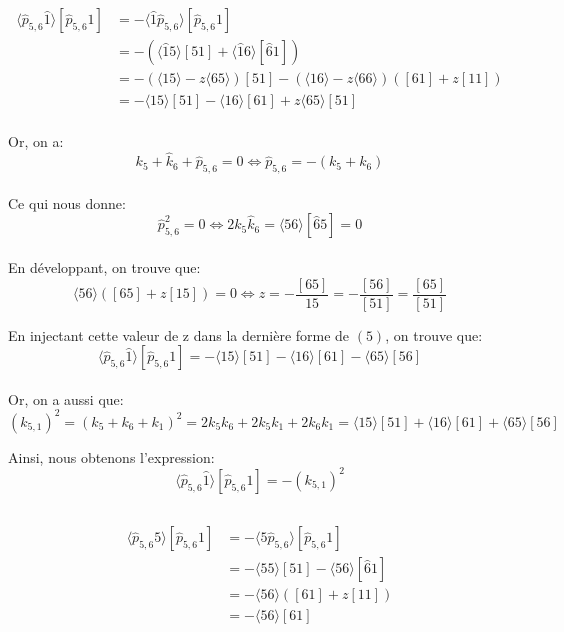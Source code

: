 \documentclass[12pt, a4paper]{article}
\begin{document}
		\subsection{}
		\begin{equation}
			\begin{split}
				\langle \hat{p}_{5,6}\hat{1} \rangle [\hat{p}_{5,6}1]
				&=- \langle \hat{1} \hat{p}_{5,6} \rangle [\hat{p}_{5,6}1]\\
				&=-(\langle \hat{1}5 \rangle [51]+ \langle \hat{1}6 \rangle [\hat{6}1])\\
				&=-(\langle 15 \rangle -z \langle 65 \rangle )[51]-(\langle 16 \rangle -z\langle 66 \rangle)([61]+z[11])\\
				&=-\langle 15 \rangle [51] - \langle 16 \rangle [61] + z \langle 65 \rangle [51]\\
			\end{split}
		\end{equation}
		
		Or, on a:  
		\[k_5 + \hat{k}_6 + \hat{p}_{5,6}=0 \Leftrightarrow \hat{p}_{5,6}=-(k_5 + k_6) \]\\
		
		Ce qui nous donne:
		\[\hat{p}_{5,6}^2=0 \Leftrightarrow 2k_5 \hat{k}_6 = \langle 56 \rangle [\hat{6}5]=0\]\\
		
		En développant, on trouve que: 
		\[\langle 56 \rangle ([65]+z[15])=0 \Leftrightarrow z=-\frac{[65]}{15}=-\frac{[56]}{[51]}=\frac{[65]}{[51]}\]
		
		En injectant cette valeur de z dans la dernière forme de $(5)$, on trouve que:
		\[\langle \hat{p}_{5,6}\hat{1} \rangle [\hat{p}_{5,6}1]= -\langle 15 \rangle [51] - \langle 16 \rangle [61] - \langle 65 \rangle [56] \]\\
		
		Or, on a aussi que:
		\[(k_{5,1})^2=(k_5 + k_6 +k_1)^2 = 2k_5 k_6 + 2k_5 k_1 +2k_6 k_1= \langle 15 \rangle [51] + \langle 16 \rangle [61] + \langle 65 \rangle [56]\]
		
		Ainsi, nous obtenons l'expression:
		\[\langle \hat{p}_{5,6}\hat{1} \rangle [\hat{p}_{5,6}1]= -(k_{5,1})^2 \]
		
		\subsection{}
		\begin{equation}
			\begin{split}
				\langle \hat{p}_{5,6} 5 \rangle[\hat{p}_{5,6}1]
				&=- \langle 5 \hat{p}_{5,6}  \rangle[\hat{p}_{5,6}1]\\
				&=- \langle 55 \rangle [51] - \langle 56 \rangle [\hat{6}1]\\
				&=- \langle 56 \rangle ([61]+z[11])\\
				&=- \langle 56 \rangle [61]
			\end{split}
		\end{equation}
		
\end{document}
